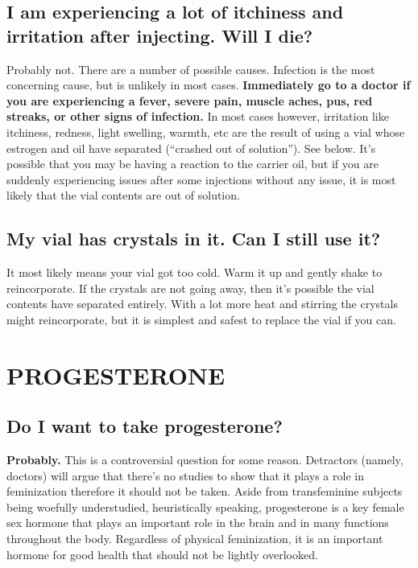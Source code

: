 \documentclass{article}
\begin{document}
{{\subsection{I am experiencing a lot of itchiness and irritation after injecting. Will I die?}

Probably not. There are a number of possible causes. Infection is the most concerning cause, but is unlikely in most cases. \textbf{Immediately go to a doctor if you are experiencing a fever, severe pain, muscle aches, pus, red streaks, or other signs of infection. }In most cases however, irritation like itchiness, redness, light swelling, warmth, etc are the result of using a vial whose estrogen and oil have separated (“crashed out of solution”). See below. It’s possible that you may be having a reaction to the carrier oil, but if you are suddenly experiencing issues after some injections without any issue, it is most likely that the vial contents are out of solution.

\subsection{My vial has crystals in it. Can I still use it?}

It most likely means your vial got too cold. Warm it up and gently shake to reincorporate. If the crystals are not going away, then it’s possible the vial contents have separated entirely. With a lot more heat and stirring the crystals might reincorporate, but it is simplest and safest to replace the vial if you can.

 

\section{PROGESTERONE}

\subsection{Do I want to take progesterone?}

\textbf{Probably.} This is a controversial question for some reason. Detractors (namely, doctors) will argue that there’s no studies to show that it plays a role in feminization therefore it should not be taken. Aside from transfeminine subjects being woefully understudied, heuristically speaking, progesterone is a key female sex hormone that plays an important role in the brain and in many functions throughout the body. Regardless of physical feminization, it is an important hormone for good health that should not be lightly overlooked.

}}
\end{document}
